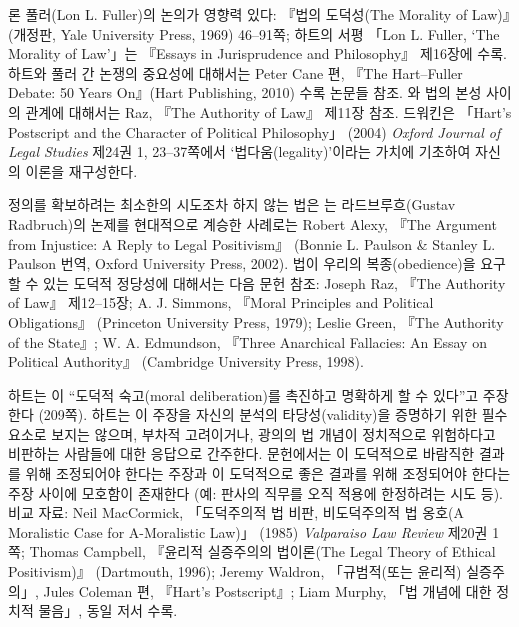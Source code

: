 { 론 풀러(Lon L. Fuller)의 논의가 영향력 있다: 『법의
도덕성(The Morality of Law)』(개정판, Yale University Press, 1969)
46--91쪽; 하트의 서평 「Lon L. Fuller, `The Morality of Law'」는
『Essays in Jurisprudence and Philosophy』 제16장에 수록. 하트와 풀러 간
논쟁의 중요성에 대해서는 Peter Cane 편, 『The Hart--Fuller Debate: 50
Years On』(Hart Publishing, 2010) 수록 논문들 참조. 와 법의 본성 사이의 관계에 대해서는 Raz, 『The Authority of Law』
제11장 참조. 드워킨은 「Hart's Postscript and the Character of Political
Philosophy」 (2004) \emph{Oxford Journal of Legal Studies} 제24권 1,
23--37쪽에서 `법다움(legality)'이라는 가치에 기초하여 자신의 이론을
재구성한다.

 정의를 확보하려는 최소한의 시도조차 하지 않는 법은 는 라드브루흐(Gustav Radbruch)의 논제를 현대적으로 계승한
사례로는 Robert Alexy, 『The Argument from Injustice: A Reply to Legal
Positivism』 (Bonnie L. Paulson \& Stanley L. Paulson 번역, Oxford
University Press, 2002). 법이 우리의 복종(obedience)을 요구할 수 있는
도덕적 정당성에 대해서는 다음 문헌 참조: Joseph Raz, 『The Authority of
Law』 제12--15장; A. J. Simmons, 『Moral Principles and Political
Obligations』 (Princeton University Press, 1979); Leslie Green, 『The
Authority of the State』; W. A. Edmundson, 『Three Anarchical Fallacies:
An Essay on Political Authority』 (Cambridge University Press, 1998).

하트는 이 ``도덕적 숙고(moral deliberation)를
촉진하고 명확하게 할 수 있다''고 주장한다 (209쪽). 하트는 이 주장을
자신의 분석의 타당성(validity)을 증명하기 위한 필수 요소로 보지는
않으며, 부차적 고려이거나, 광의의 법 개념이 정치적으로 위험하다고
비판하는 사람들에 대한 응답으로 간주한다. 문헌에서는 이 도덕적으로 바람직한 결과를 위해 조정되어야 한다는
주장과 이 도덕적으로 좋은 결과를
위해 조정되어야 한다는 주장 사이에 모호함이 존재한다 (예: 판사의 직무를
오직  적용에 한정하려는 시도
등). 비교 자료: Neil MacCormick, 「도덕주의적 법 비판, 비도덕주의적 법
옹호(A Moralistic Case for A-Moralistic Law)」 (1985) \emph{Valparaiso
Law Review} 제20권 1쪽; Thomas Campbell, 『윤리적 실증주의의 법이론(The
Legal Theory of Ethical Positivism)』 (Dartmouth, 1996); Jeremy Waldron,
「규범적(또는 윤리적) 실증주의」, Jules Coleman 편, 『Hart's
Postscript』; Liam Murphy, 「법 개념에 대한 정치적 물음」, 동일 저서
수록.

}